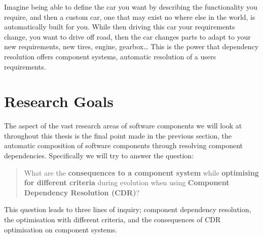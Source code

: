 Imagine being able to define the car you want by describing the functionality you require, and then a custom car, one that may exist no where else in the world,
is automatically built for you. 
While then driving this car your requirements change, you want to drive off road, then the car changes parts to adapt to your new requirements, new tires, engine, gearbox\ldots
This is the power that dependency resolution offers component systems, automatic resolution of a users requirements.

\section{Research Goals}
{}The aspect of the vast research areas of software components we will look at throughout this thesis is the final point made in the previous section, 
{}the automatic composition of software components through resolving component dependencies.
{}Specifically we will try to answer the question:\\
{}\begin{quote}
{}What are the \textbf{consequences to a component system} while \textbf{optimising for different criteria} during evolution when using \textbf{Component Dependency Resolution (CDR)}?
{}\end{quote}

{}This question leads to three lines of inquiry; component dependency resolution, the optimisation with different criteria, and the consequences of CDR optimisation on component systems.



